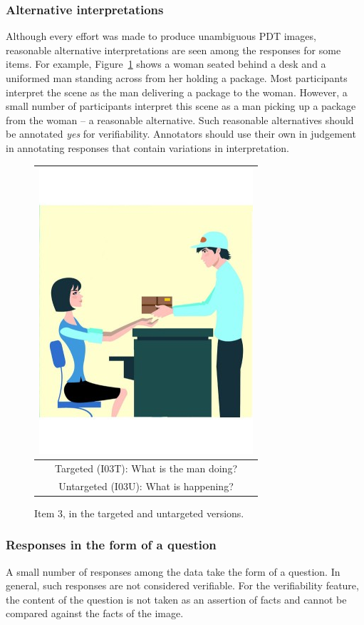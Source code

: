 \documentclass[12pt]{article}
\begin{document}
\subsubsection{Alternative interpretations} Although every effort was made to produce unambiguous PDT images, reasonable alternative interpretations are seen among the responses for some items. For example, Figure~\ref{fig:deliver-package} shows a woman seated behind a desk and a uniformed man standing across from her holding a package. Most participants interpret the scene as the man delivering a package to the woman. However, a small number of participants interpret this scene as a man picking up a package from the woman -- a reasonable alternative. Such reasonable alternatives should be annotated \textit{yes} for verifiability. Annotators should use their own in judgement in annotating responses that contain variations in interpretation.

\begin{figure}[h]
\begin{center}
\begin{tabular}{|c|}
\hline
\includegraphics[width=0.4\columnwidth,trim=0 0 0 -3]{figures/I03.jpg}\\
\hline
Targeted (I03T): What is the man doing?\\
\hline
Untargeted (I03U): What is happening? \\
\hline
\end{tabular}
\end{center}
\caption{Item 3, in the targeted and untargeted versions.}
\label{fig:deliver-package}
\end{figure}

\subsubsection{Responses in the form of a question} \label{subsubsec:verif-question} A small number of responses among the data take the form of a question. In general, such responses are not considered verifiable. For the verifiability feature, the content of the question is not taken as an assertion of facts and cannot be compared against the facts of the image. 
\end{document}
